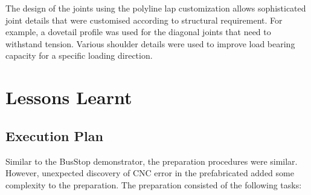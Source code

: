 The design of the joints using the polyline lap customization allows sophisticated joint details that were customised according to structural requirement. For example, a dovetail profile was used for the diagonal joints that need to withstand tension. Various shoulder details were used to improve load bearing capacity for a specific loading direction.


\section{Lessons Learnt}
\subsection{Execution Plan}
Similar to the BusStop demonstrator, the preparation procedures were similar. However, unexpected discovery of CNC error in the prefabricated added some complexity to the preparation. The preparation consisted of the following tasks:
